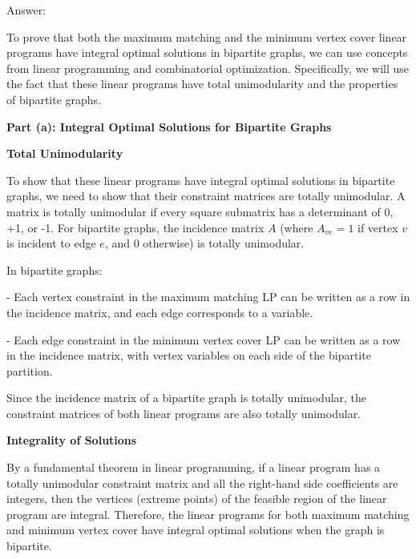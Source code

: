 \documentclass{oxmathproblems}
\begin{document}
\begin{questions}

Answer:

To prove that both the maximum matching and the minimum vertex cover linear programs have integral optimal solutions in bipartite graphs, we can use concepts from linear programming and combinatorial optimization. Specifically, we will use the fact that these linear programs have total unimodularity and the properties of bipartite graphs.

\textbf{Part (a): Integral Optimal Solutions for Bipartite Graphs}

\textbf{Total Unimodularity}

To show that these linear programs have integral optimal solutions in bipartite graphs, we need to show that their constraint matrices are totally unimodular. A matrix is totally unimodular if every square submatrix has a determinant of 0, +1, or -1. For bipartite graphs, the incidence matrix \( A \) (where \( A_{ve} = 1 \) if vertex \( v \) is incident to edge \( e \), and 0 otherwise) is totally unimodular.

In bipartite graphs:

- Each vertex constraint in the maximum matching LP can be written as a row in the incidence matrix, and each edge corresponds to a variable.

- Each edge constraint in the minimum vertex cover LP can be written as a row in the incidence matrix, with vertex variables on each side of the bipartite partition.

Since the incidence matrix of a bipartite graph is totally unimodular, the constraint matrices of both linear programs are also totally unimodular. 

\textbf{Integrality of Solutions}

By a fundamental theorem in linear programming, if a linear program has a totally unimodular constraint matrix and all the right-hand side coefficients are integers, then the vertices (extreme points) of the feasible region of the linear program are integral. Therefore, the linear programs for both maximum matching and minimum vertex cover have integral optimal solutions when the graph is bipartite.


\end{questions}
\end{document}

